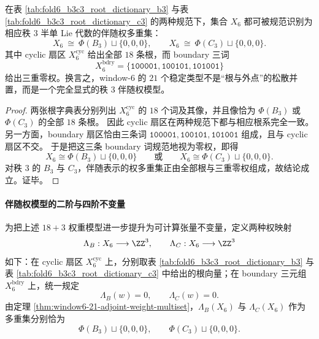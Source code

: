 \begin{theorem}[window-\(6\) 的 \texorpdfstring{$21=18+3$}{21=18+3} 分解精确实现 \texorpdfstring{$B_3/C_3$}{B3/C3} 伴随权多重集]\label{thm:window6-21-adjoint-weight-multiset}
在表 \ref{tab:fold6_b3c3_root_dictionary_b3} 与表 \ref{tab:fold6_b3c3_root_dictionary_c3} 的两种规范下，集合 \(X_6\) 都可被规范识别为相应秩 \(3\) 半单 Lie 代数的伴随权多重集：
\[
X_6\ \cong\ \Phi(B_3)\sqcup \{0,0,0\},
\qquad
X_6\ \cong\ \Phi(C_3)\sqcup \{0,0,0\}.
\]
其中 cyclic 扇区 \(X_6^{\mathrm{cyc}}\) 给出全部 \(18\) 条根，而 boundary 三词
\[
X_6^{\mathrm{bdry}}=\{\texttt{100001},\texttt{100101},\texttt{101001}\}
\]
给出三重零权。换言之，window-\(6\) 的 \(21\) 个稳定类型不是“根与外点”的松散并置，而是一个完全显式的秩 \(3\) 伴随权模型。
\end{theorem}
\begin{proof}
两张根字典表分别列出 \(X_6^{\mathrm{cyc}}\) 的 \(18\) 个词及其像，并且像恰为 \(\Phi(B_3)\) 或 \(\Phi(C_3)\) 的全部 \(18\) 条根。
因此 cyclic 扇区在两种规范下都与相应根系完全一致。
另一方面，boundary 扇区恰由三条词
\(\texttt{100001},\texttt{100101},\texttt{101001}\)
组成，且与 cyclic 扇区不交。
于是把这三条 boundary 词规范地视为零权，即得
\[
X_6\cong \Phi(B_3)\sqcup\{0,0,0\}
\qquad\text{或}\qquad
X_6\cong \Phi(C_3)\sqcup\{0,0,0\}.
\]
对秩 \(3\) 的 \(B_3\) 与 \(C_3\)，伴随表示的权多重集正由全部根与三重零权组成，故结论成立。证毕。
\end{proof}

\paragraph{伴随权模型的二阶与四阶不变量}
为把上述 \(18+3\) 权重模型进一步提升为可计算张量不变量，定义两种权映射
\[
\Lambda_B:X_6\longrightarrow \ZZ^3,
\qquad
\Lambda_C:X_6\longrightarrow \ZZ^3
\]
如下：在 cyclic 扇区 \(X_6^{\mathrm{cyc}}\) 上，分别取表 \ref{tab:fold6_b3c3_root_dictionary_b3} 与表 \ref{tab:fold6_b3c3_root_dictionary_c3} 中给出的根向量；在 boundary 三元组 \(X_6^{\mathrm{bdry}}\) 上，统一规定
\[
\Lambda_B(w)=0,
\qquad
\Lambda_C(w)=0.
\]
由定理 \ref{thm:window6-21-adjoint-weight-multiset}，\(\Lambda_B(X_6)\) 与 \(\Lambda_C(X_6)\) 作为多重集分别恰为
\[
\Phi(B_3)\sqcup \{0,0,0\},
\qquad
\Phi(C_3)\sqcup \{0,0,0\}.
\]

